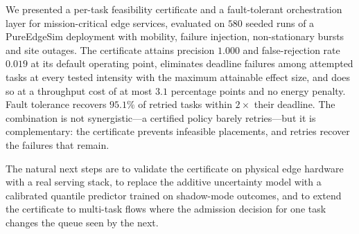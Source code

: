 \documentclass[journal,10pt]{IEEEtran}
\begin{document}
We presented a per-task feasibility certificate and a fault-tolerant
orchestration layer for mission-critical edge services, evaluated on $580$
seeded runs of a PureEdgeSim deployment with mobility, failure injection,
non-stationary bursts and site outages. The certificate attains precision
$1.000$ and false-rejection rate $0.019$ at its default operating point,
eliminates deadline failures among attempted tasks at every tested intensity
with the maximum attainable effect size, and does so at a throughput cost of at
most $3.1$ percentage points and no energy penalty. Fault tolerance recovers
$95.1\%$ of retried tasks within $2\times$ their deadline. The combination is
not synergistic---a certified policy barely retries---but it is complementary:
the certificate prevents infeasible placements, and retries recover the
failures that remain.

The natural next steps are to validate the certificate on physical edge
hardware with a real serving stack, to replace the additive uncertainty model
with a calibrated quantile predictor trained on shadow-mode outcomes, and to
extend the certificate to multi-task flows where the admission decision for one
task changes the queue seen by the next.

\balance


\end{document}
